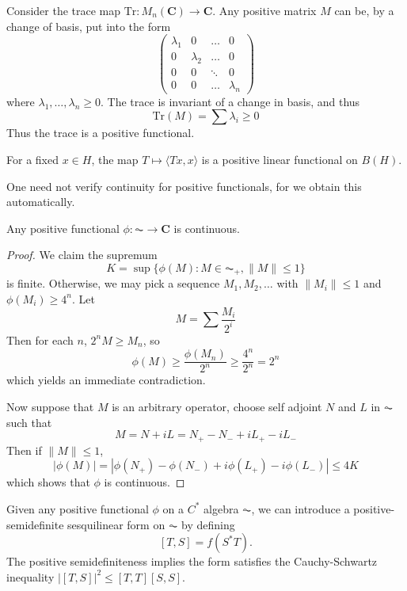 \begin{example}
    Consider the trace map $\text{Tr}: M_n(\mathbf{C}) \to \mathbf{C}$. Any positive matrix $M$ can be, by a change of basis, put into the form
    \[ \begin{pmatrix} \lambda_1 & 0 & \dots & 0 \\ 0 & \lambda_2 & \dots & 0 \\ 0 & 0 & \ddots & 0 \\ 0 & 0 & \dots & \lambda_n \end{pmatrix} \]
    where $\lambda_1, \dots, \lambda_n \geq 0$. The trace is invariant of a change in basis, and thus
    \[ \text{Tr}(M) = \sum \lambda_i \geq 0 \]
    Thus the trace is a positive functional.
\end{example}

\begin{example}
    For a fixed $x \in H$, the map $T \mapsto \langle Tx, x \rangle$ is a positive linear functional on $B(H)$.
\end{example}

One need not verify continuity for positive functionals, for we obtain this automatically.

\begin{prop}
    Any positive functional $\phi : \AC \to \mathbf{C}$ is continuous.
\end{prop}
\begin{proof}
    We claim the supremum
    \[ K = \sup \{ \phi(M): M \in \AC_+, \| M \| \leq 1 \} \]
    is finite. Otherwise, we may pick a sequence $M_1, M_2, \dots$ with $\| M_i \| \leq 1$ and $\phi(M_i) \geq 4^n$. Let
    \[ M = \sum \frac{M_i}{2^i} \]
    Then for each $n$, $2^n M \geq M_n$, so
    \[ \phi(M) \geq \frac{\phi(M_n)}{2^n} \geq \frac{4^n}{2^n} = 2^n \]
    which yields an immediate contradiction.

    Now suppose that $M$ is an arbitrary operator, choose self adjoint $N$ and $L$ in $\AC$ such that
    \[ M = N + iL = N_+ - N_- + iL_+ - iL_- \]
    Then if $\| M \| \leq 1$,
    \[ |\phi(M)| = |\phi(N_+) - \phi(N_-) + i\phi(L_+) - i\phi(L_-)| \leq 4K \]
    which shows that $\phi$ is continuous.
\end{proof}

Given any positive functional $\phi$ on a $C^*$ algebra $\AC$, we can introduce a positive-semidefinite sesquilinear form on $\AC$ by defining
%
\[ [T,S] = f(S^* T). \]
%
The positive semidefiniteness implies the form satisfies the Cauchy-Schwartz inequality $|[T,S]|^2 \leq [T,T] [S,S]$.

